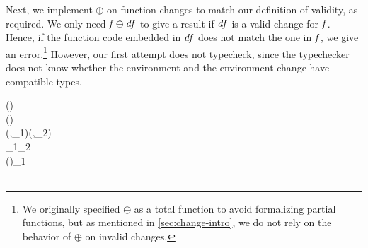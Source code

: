 Next, we implement \ensuremath{\oplus } on function changes to match our definition of
validity, as required. We only need \ensuremath{\Varid{f}\oplus \Varid{df}} to give a result if \ensuremath{\Varid{df}} is a
valid change for \ensuremath{\Varid{f}}. Hence, if the function code embedded in \ensuremath{\Varid{df}} does not
match the one in \ensuremath{\Varid{f}}, we give an error.\footnote{We originally specified
\ensuremath{\oplus } as a total function to avoid formalizing partial functions, but as
mentioned in \cref{sec:change-intro}, we do not rely on the behavior of
\ensuremath{\oplus } on invalid changes.}
However, our first attempt does not typecheck, since the typechecker does not
know whether the environment and the environment change have compatible types.
\begin{hscode}\SaveRestoreHook
{}%
%
%
%
%
\>[B]{}\;\;(\;\sigma\;\tau)\;\<[E]%
\\
\>[B]{}\<[3]%
\>[3]{}\;\Delta (\;\sigma\;\tau)\mathrel{=}\;\sigma\;\tau{}\<[E]%
\\
\>[B]{}\<[3]%
\>[3]{}\;(,_{1})\oplus {}\;(,_{2})\mathrel{=}{}\<[E]%
\\
\>[3]{}\<[5]%
\>[5]{}\;_{1}\equiv{}_{2}\;\<[E]%
\\
\>[5]{}\<[7]%
\>[7]{}\;(\oplus {})\;_{1}{}\<[E]%
\\
\>[3]{}\<[5]%
\>[5]{}\<[E]%
\\
\>[5]{}\<[7]%
\>[7]{}\;\<[E]%
\ColumnHook
\end{hscode}\resethooks

